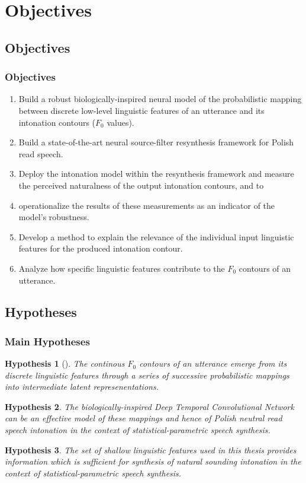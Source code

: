 \documentclass[a4paper,9pt]{beamer}
\theoremstyle{mytheoremstyle}
\newtheorem{hypothesis}{Hypothesis}
\begin{document}
\section{Objectives}
\subsection{Objectives}
\begin{frame}
\frametitle{Objectives}
\begin{enumerate}
\item<1-2> Build a robust biologically-inspired neural model of the probabilistic mapping between discrete low-level linguistic features of an utterance and its intonation contours ($F_{0}$ values).
\item<2> Build a state-of-the-art neural source-filter resynthesis framework for Polish read speech.
\item<2> Deploy the intonation model within the resynthesis framework and measure the perceived naturalness of the output intonation contours, and to
\item<2> operationalize the results of these measurements as an indicator of the model's robustness.
\item<2> Develop a method to explain the relevance of the individual input linguistic features for the produced intonation contour.
\item<1-2> Analyze how specific linguistic features contribute to the $F_{0}$ contours of an utterance.
\end{enumerate}
\end{frame}

\subsection{Hypotheses}
\begin{frame}
\frametitle{Main Hypotheses}
\begin{tcolorbox}
\begin{hypothesis}[] The continous $F_0$ contours of an utterance emerge from its discrete linguistic features through a series of successive probabilistic mappings into intermediate latent represenentations.
\end{hypothesis}
\begin{hypothesis}
The biologically-inspired Deep Temporal Convolutional Network can be an effective model of these mappings and hence of Polish neutral read speech intonation in the context of statistical-parametric speech synthesis. \label{secondary:a}
\end{hypothesis}
\begin{hypothesis}
The set of shallow linguistic features used in this thesis provides information which is sufficient for synthesis of natural sounding intonation in the context of statistical-parametric speech synthesis. \label{secondary:b}
\end{hypothesis}
\end{tcolorbox}
\end{frame}
\end{document}
